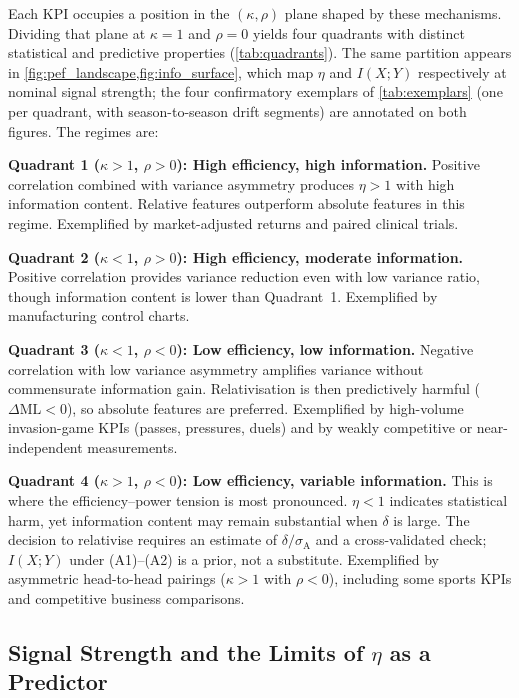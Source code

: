Each KPI occupies a position in the $(\kappa,\rho)$ plane shaped by these mechanisms. Dividing that plane at $\kappa=1$ and $\rho=0$ yields four quadrants with distinct statistical and predictive properties (\cref{tab:quadrants}). The same partition appears in \cref{fig:pef_landscape,fig:info_surface}, which map $\eta$ and $I(X;Y)$ respectively at nominal signal strength; the four confirmatory exemplars of \cref{tab:exemplars} (one per quadrant, with season-to-season drift segments) are annotated on both figures. The regimes are:

\textbf{Quadrant 1 ($\kappa>1$, $\rho>0$): High efficiency, high information.} Positive correlation combined with variance asymmetry produces $\eta>1$ with high information content. Relative features outperform absolute features in this regime. Exemplified by market-adjusted returns and paired clinical trials.

\textbf{Quadrant 2 ($\kappa<1$, $\rho>0$): High efficiency, moderate information.} Positive correlation provides variance reduction even with low variance ratio, though information content is lower than Quadrant~1. Exemplified by manufacturing control charts.

\textbf{Quadrant 3 ($\kappa<1$, $\rho<0$): Low efficiency, low information.} Negative correlation with low variance asymmetry amplifies variance without commensurate information gain. Relativisation is then predictively harmful ($\Delta\mathrm{ML}<0$), so absolute features are preferred. Exemplified by high-volume invasion-game KPIs (passes, pressures, duels) and by weakly competitive or near-independent measurements.

\textbf{Quadrant 4 ($\kappa>1$, $\rho<0$): Low efficiency, variable information.} This is where the efficiency--power tension is most pronounced. $\eta<1$ indicates statistical harm, yet information content may remain substantial when $\delta$ is large. The decision to relativise requires an estimate of $\delta/\sigma_{\mathrm{A}}$ and a cross-validated check; $I(X;Y)$ under (A1)--(A2) is a prior, not a substitute. Exemplified by asymmetric head-to-head pairings ($\kappa>1$ with $\rho<0$), including some sports KPIs and competitive business comparisons.

\subsection{Signal Strength and the Limits of \texorpdfstring{$\eta$}{eta} as a Predictor}
\label{sec:signal_strength}

